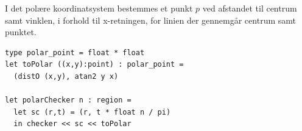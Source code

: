 \documentclass[rgb]{beamer}
\begin{document}
\begin{frame}[fragile]
\begin{footnotesize}


  I det polære koordinatsystem bestemmes et punkt $p$ ved afstandet
  til centrum samt vinklen, i forhold til x-retningen, for linien der
  gennemgår centrum samt punktet.

  \sp

\begin{lstlisting}[numbers=none,frame=none,mathescape]
type polar_point = float * float
let toPolar ((x,y):point) : polar_point =
  (distO (x,y), atan2 y x)

let polarChecker n : region =
  let sc (r,t) = (r, t * float n / pi)
  in checker << sc << toPolar
\end{lstlisting}

\mbox{ }\hfill
{}\hfill
{}
\hfill \mbox{ }

\end{footnotesize}
\end{frame}
\end{document}
